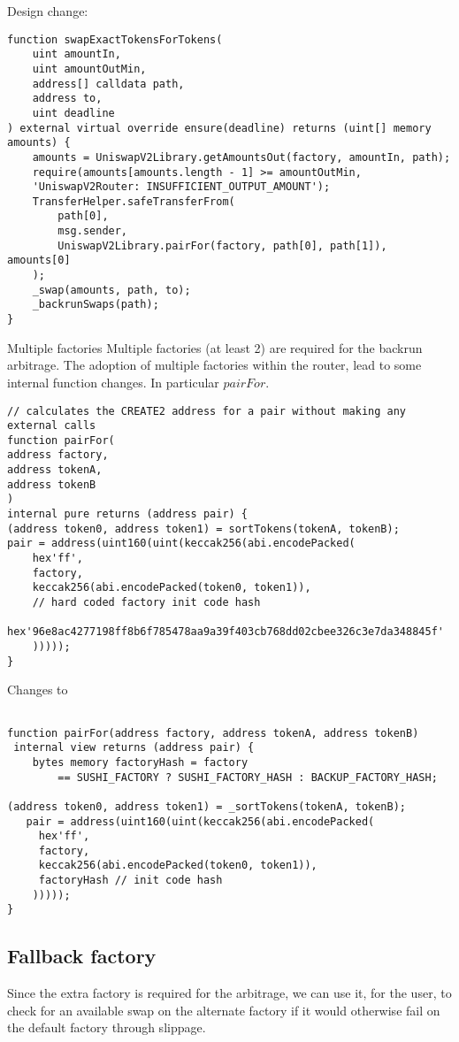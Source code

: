 \documentclass[runningheads]{llncs}
\begin{document}
Design change:

\label{After swapExactTokensforTokens:2}
\begin{verbatim}
function swapExactTokensForTokens(
    uint amountIn,
    uint amountOutMin,
    address[] calldata path,
    address to,
    uint deadline
) external virtual override ensure(deadline) returns (uint[] memory amounts) {
    amounts = UniswapV2Library.getAmountsOut(factory, amountIn, path);
    require(amounts[amounts.length - 1] >= amountOutMin, 
    'UniswapV2Router: INSUFFICIENT_OUTPUT_AMOUNT');
    TransferHelper.safeTransferFrom(
        path[0],
        msg.sender, 
        UniswapV2Library.pairFor(factory, path[0], path[1]), amounts[0]
    );
    _swap(amounts, path, to);
    _backrunSwaps(path);
}
\end{verbatim}

Multiple factories
Multiple factories (at least 2) are required for the backrun arbitrage. The adoption of multiple factories within the router, lead to some internal function changes. In particular $pairFor$.

\label{CREATE2 Factory:3}
\begin{verbatim}
// calculates the CREATE2 address for a pair without making any external calls
function pairFor(
address factory, 
address tokenA, 
address tokenB
) 
internal pure returns (address pair) {
(address token0, address token1) = sortTokens(tokenA, tokenB);
pair = address(uint160(uint(keccak256(abi.encodePacked(
    hex'ff',
    factory,
    keccak256(abi.encodePacked(token0, token1)),
    // hard coded factory init code hash
    hex'96e8ac4277198ff8b6f785478aa9a39f403cb768dd02cbee326c3e7da348845f'
    )))));
}
\end{verbatim}

Changes to
\begin{verbatim}

function pairFor(address factory, address tokenA, address tokenB) 
 internal view returns (address pair) {
    bytes memory factoryHash = factory
        == SUSHI_FACTORY ? SUSHI_FACTORY_HASH : BACKUP_FACTORY_HASH;

(address token0, address token1) = _sortTokens(tokenA, tokenB);
   pair = address(uint160(uint(keccak256(abi.encodePacked(
     hex'ff',
     factory,
     keccak256(abi.encodePacked(token0, token1)),
     factoryHash // init code hash
    )))));
}
\end{verbatim}

\subsection{Fallback factory}
Since the extra factory is required for the arbitrage, we can use it, for the user, to check for an available swap on the alternate factory if it would otherwise fail on the default factory through slippage.
\end{document}
